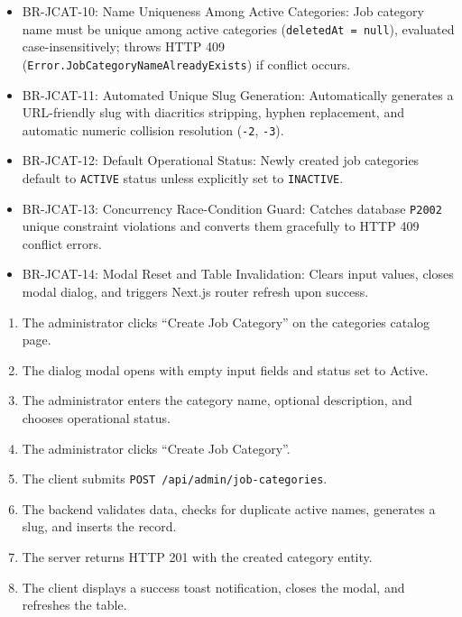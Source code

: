 \begin{itemize}[leftmargin=1.6em,topsep=3pt,itemsep=2pt,parsep=0pt,label=$\bullet$]\brrulelist
    \item BR-JCAT-10: Name Uniqueness Among Active Categories: Job category name must be unique among active categories (\texttt{deletedAt = null}), evaluated case-insensitively; throws HTTP 409 (\texttt{Error.JobCategoryNameAlreadyExists}) if conflict occurs.
    \item BR-JCAT-11: Automated Unique Slug Generation: Automatically generates a URL-friendly slug with diacritics stripping, hyphen replacement, and automatic numeric collision resolution (\texttt{-2}, \texttt{-3}).
    \item BR-JCAT-12: Default Operational Status: Newly created job categories default to \texttt{ACTIVE} status unless explicitly set to \texttt{INACTIVE}.
    \item BR-JCAT-13: Concurrency Race-Condition Guard: Catches database \texttt{P2002} unique constraint violations and converts them gracefully to HTTP 409 conflict errors.
    \item BR-JCAT-14: Modal Reset and Table Invalidation: Clears input values, closes modal dialog, and triggers Next.js router refresh upon success.
\end{itemize}

\begin{enumerate}[leftmargin=1.6em,topsep=3pt,itemsep=2pt,parsep=0pt]
    \item The administrator clicks ``Create Job Category'' on the categories catalog page.
    \item The dialog modal opens with empty input fields and status set to Active.
    \item The administrator enters the category name, optional description, and chooses operational status.
    \item The administrator clicks ``Create Job Category''.
    \item The client submits \texttt{POST /api/admin/job-categories}.
    \item The backend validates data, checks for duplicate active names, generates a slug, and inserts the record.
    \item The server returns HTTP 201 with the created category entity.
    \item The client displays a success toast notification, closes the modal, and refreshes the table.
\end{enumerate}

